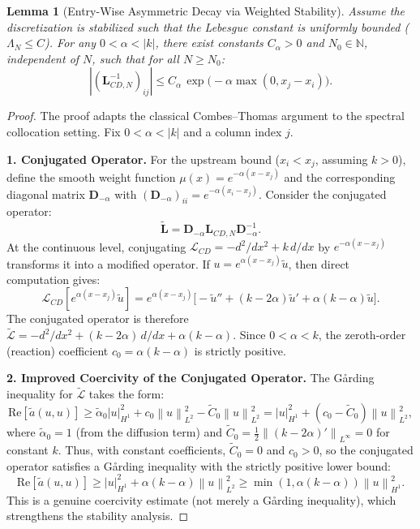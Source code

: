 \documentclass[pdflatex,sn-mathphys-num]{sn-jnl}%
\theoremstyle{thmstyleone}%
\newtheorem{lemma}{Lemma}
\newcommand{\norm}[1]{\left\lVert#1\right\rVert}
\newcommand{\mat}[1]{\mathbf{#1}}
\begin{document}
\begin{lemma}[Entry-Wise Asymmetric Decay via Weighted Stability]
\label{lem:combes_thomas}
Assume the discretization is stabilized such that the Lebesgue constant is uniformly bounded ($\Lambda_N \le C$). For any $0 < \alpha < |k|$, there exist constants $C_{\alpha} > 0$ and $N_0 \in \mathbb{N}$, independent of $N$, such that for all $N \ge N_0$:
\begin{equation}|(\mat{L}_{CD,N}^{-1})_{ij}| \le C_{\alpha}\, \exp\bigl(-\alpha \max(0, x_j - x_i)\bigr).\end{equation}
\end{lemma}
\begin{proof}
The proof adapts the classical Combes--Thomas argument \cite{combes1973asymptotic} to the spectral collocation setting. Fix $0 < \alpha < |k|$ and a column index $j$.

\noindent\textbf{1. Conjugated Operator.}
For the upstream bound ($x_i < x_j$, assuming $k > 0$), define the smooth weight function $\mu(x) = e^{-\alpha(x - x_j)}$ and the corresponding diagonal matrix $\mat{D}_{-\alpha}$ with $(\mat{D}_{-\alpha})_{ii} = e^{-\alpha(x_i - x_j)}$. Consider the conjugated operator:
\begin{equation} \widetilde{\mat{L}} = \mat{D}_{-\alpha} \mat{L}_{CD,N} \mat{D}_{-\alpha}^{-1}. \end{equation}
At the continuous level, conjugating $\mathcal{L}_{CD} = -d^2/dx^2 + k\,d/dx$ by $e^{-\alpha(x - x_j)}$ transforms it into a modified operator. If $u = e^{\alpha(x-x_j)}\tilde{u}$, then direct computation gives:
\begin{equation} \mathcal{L}_{CD}[e^{\alpha(x-x_j)}\tilde{u}] = e^{\alpha(x-x_j)}\bigl[-\tilde{u}'' + (k - 2\alpha)\tilde{u}' + \alpha(k - \alpha)\tilde{u}\bigr]. \end{equation}
The conjugated operator is therefore $\widetilde{\mathcal{L}} = -d^2/dx^2 + (k - 2\alpha)\,d/dx + \alpha(k - \alpha)$. Since $0 < \alpha < k$, the zeroth-order (reaction) coefficient $c_0 = \alpha(k - \alpha)$ is strictly positive.

\noindent\textbf{2. Improved Coercivity of the Conjugated Operator.}
The G\r{a}rding inequality for $\widetilde{\mathcal{L}}$ takes the form:
\begin{equation} \text{Re}[\tilde{a}(u,u)] \ge \tilde{\alpha}_0 |u|_{H^1}^2 + c_0 \norm{u}_{L^2}^2 - \tilde{C}_0 \norm{u}_{L^2}^2 = |u|_{H^1}^2 + (c_0 - \tilde{C}_0)\norm{u}_{L^2}^2, \end{equation}
where $\tilde{\alpha}_0 = 1$ (from the diffusion term) and $\tilde{C}_0 = \frac{1}{2}\norm{(k - 2\alpha)'}_{L^\infty} = 0$ for constant $k$. Thus, with constant coefficients, $\tilde{C}_0 = 0$ and $c_0 > 0$, so the conjugated operator satisfies a G\r{a}rding inequality with the strictly positive lower bound:
\begin{equation} \text{Re}[\tilde{a}(u,u)] \ge |u|_{H^1}^2 + \alpha(k-\alpha)\norm{u}_{L^2}^2 \ge \min(1, \alpha(k-\alpha))\norm{u}_{H^1}^2. \end{equation}
This is a genuine coercivity estimate (not merely a G\r{a}rding inequality), which strengthens the stability analysis.


\end{proof}
\end{document}

